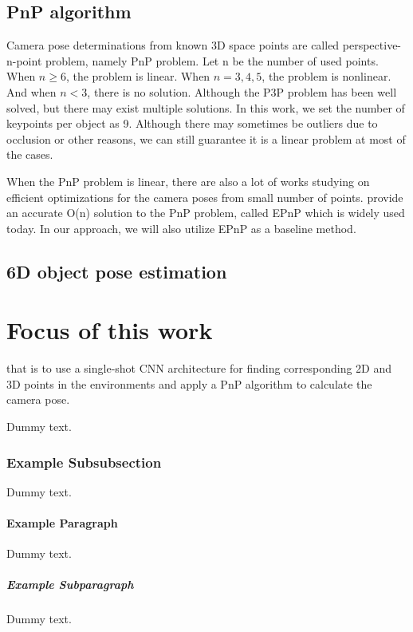 \subsection{PnP algorithm}

Camera pose determinations from known 3D space points are called perspective-n-point problem, namely PnP problem. Let n be the number of used points. When $n \geq 6$, the problem is linear. When $n = 3,4,5$, the problem is nonlinear. And when $n < 3$, there is no solution. Although the P3P problem has been well solved, but there may exist multiple solutions. In this work, we set the number of keypoints per object as 9. Although there may sometimes be outliers due to occlusion or other reasons, we can still guarantee it is a linear problem at most of the cases.

When the PnP problem is linear, there are also a lot of works studying on efficient optimizations for the camera poses from small number of points. \cite{lepetit2009epnp} provide an accurate O(n) solution to the PnP problem, called EPnP which is widely used today. In our approach, we will also utilize EPnP as a baseline method.

\subsection{6D object pose estimation}



\section{Focus of this work}

that is to use a single-shot CNN architecture for finding corresponding 2D and 3D points in the environments and apply a PnP algorithm to calculate the camera pose.



Dummy text.

\subsubsection{Example Subsubsection}

Dummy text.

\paragraph{Example Paragraph}

Dummy text.

\subparagraph{Example Subparagraph}

Dummy text.
